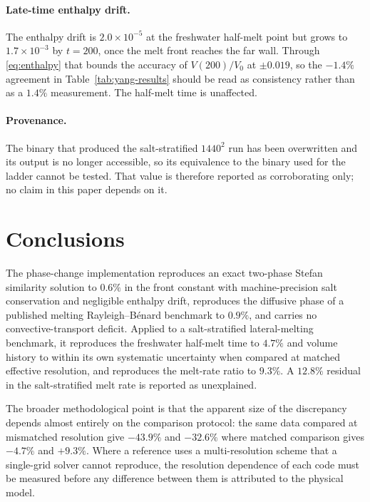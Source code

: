 \documentclass[review,12pt]{elsarticle}
\begin{document}
\paragraph{Late-time enthalpy drift.} The enthalpy drift is
$2.0\times10^{-5}$ at the freshwater half-melt point but grows to
$1.7\times10^{-3}$ by $t=200$, once the melt front reaches the far wall. Through
\eqref{eq:enthalpy} that bounds the accuracy of $V(200)/V_0$ at $\pm0.019$, so
the $-1.4\%$ agreement in Table~\ref{tab:yang-results} should be read as
consistency rather than as a $1.4\%$ measurement. The half-melt time is
unaffected.

\paragraph{Provenance.} The binary that produced the salt-stratified $1440^2$
run has been overwritten and its output is no longer accessible, so its
equivalence to the binary used for the ladder cannot be tested. That value is
therefore reported as corroborating only; no claim in this paper depends on it.

\section{Conclusions}

The phase-change implementation reproduces an exact two-phase Stefan similarity
solution to $0.6\%$ in the front constant with machine-precision salt
conservation and negligible enthalpy drift, reproduces the diffusive phase of a
published melting Rayleigh--B\'enard benchmark to $0.9\%$, and carries no
convective-transport deficit. Applied to a salt-stratified lateral-melting
benchmark, it reproduces the freshwater half-melt time to $4.7\%$ and volume
history to within its own systematic uncertainty when compared at matched
effective resolution, and reproduces the melt-rate ratio to $9.3\%$. A
$12.8\%$ residual in the salt-stratified melt rate is reported as unexplained.

The broader methodological point is that the apparent size of the discrepancy
depends almost entirely on the comparison protocol: the same data compared at
mismatched resolution give $-43.9\%$ and $-32.6\%$ where matched comparison
gives $-4.7\%$ and $+9.3\%$. Where a reference uses a multi-resolution scheme
that a single-grid solver cannot reproduce, the resolution dependence of each
code must be measured before any difference between them is attributed to the
physical model.
\end{document}
